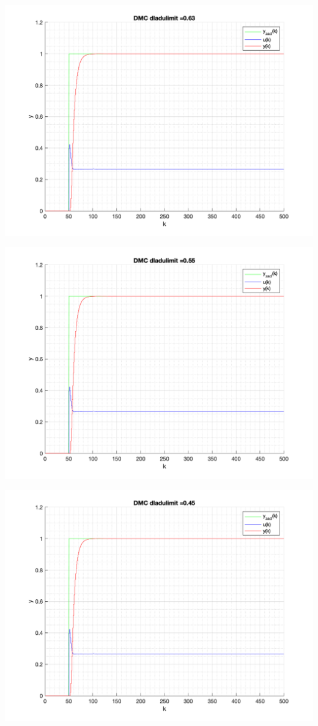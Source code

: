 \documentclass[a4paper, 11pt]{article}
\begin{document}
\begin{enumerate}
 \includegraphics[width=\linewidth]{./ModelsP6_dulimit/P4_DMC_dulimit_0_63_png.png} 
 
 \includegraphics[width=\linewidth]{./ModelsP6_dulimit/P4_DMC_dulimit_0_55_png.png} 
 
 \includegraphics[width=\linewidth]{./ModelsP6_dulimit/P4_DMC_dulimit_0_45_png.png} 
 

\end{enumerate}
\end{document}
